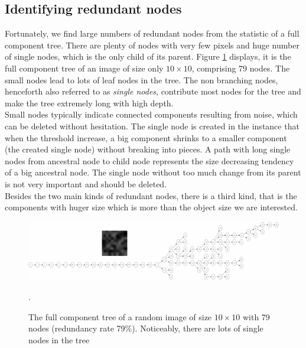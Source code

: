 \subsection{Identifying redundant nodes}
Fortunately, we find large numbers of redundant nodes from the statistic of a full component tree. There are plenty of nodes with very few pixels and huge number of single nodes, which is the only child of its parent. Figure \ref{fig:cptree-random} displays, it is the full component tree of an image of size only $10\times10$, comprising 79 nodes. The small nodes lead to lots of leaf nodes in the tree. The non branching nodes, henceforth also referred to as \emph{single nodes}, contribute most nodes for the tree and make the tree extremely long with high depth. \\
Small nodes typically indicate connected components resulting from noise, which can be deleted without hesitation. The single node is created in the instance that when the threshold increase, a big component shrinks to a smaller component (the created single node) without breaking into pieces. A path with long single nodes from ancestral node to child node represents the size decreasing tendency of a big ancestral node. The single node without too much change from its parent is not very important and should be deleted.\\
Besides the two main kinds of redundant nodes, there is a third kind, that is the components with huger size which is more than the object size we are interested. 
\begin{figure}[htbp]
\centering
\includegraphics[width=1.0\textwidth]{images/cptree_random}
\caption[The full component tree of a random image]{The full component tree of a random image of size $10\times10$ with 79 nodes (redundancy rate 79\%). Noticeably, there are lots of single nodes in the tree}.
\label{fig:cptree-random}
\end{figure}

